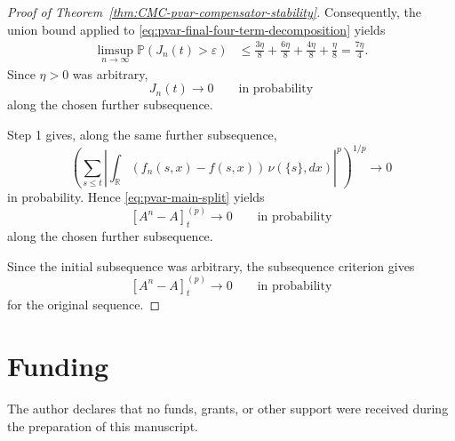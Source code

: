 \documentclass[a4paper,10pt]{article}
\renewcommand{\P}{\mathbb P}
\begin{document}
\begin{proof}[Proof of Theorem~\ref{thm:CMC-pvar-compensator-stability}]
Consequently, the union bound applied to
\eqref{eq:pvar-final-four-term-decomposition} yields
\[
\begin{aligned}
\limsup_{n\to\infty}\P(J_n(t)>\varepsilon)
&\le
\frac{3\eta}{8}
+
\frac{6\eta}{8}
+
\frac{4\eta}{8}
+
\frac{\eta}{8}
=
\frac{7\eta}{4}.
\end{aligned}
\]
Since \(\eta>0\) was arbitrary,
\[
        J_n(t)\longrightarrow0
        \qquad\text{in probability}
\]
along the chosen further subsequence.

Step 1 gives, along the same further subsequence,
\[
\left(
\sum_{s\le t}
\left|
\int_{\mathbb R}
(f_n(s,x)-f(s,x))\,\nu(\{s\},dx)
\right|^p
\right)^{1/p}
\longrightarrow0
\]
in probability. Hence \eqref{eq:pvar-main-split} yields
\[
        [A^n-A]^{(p)}_t
        \longrightarrow0
        \qquad\text{in probability}
\]
along the chosen further subsequence.

Since the initial subsequence was arbitrary, the subsequence criterion
gives
\[
        [A^n-A]^{(p)}_t
        \longrightarrow0
        \qquad\text{in probability}
\]
for the original sequence.
\end{proof}














	


\section*{Funding}
The author declares that no funds, grants, or other support were
received during the preparation of this manuscript.
\end{document}
